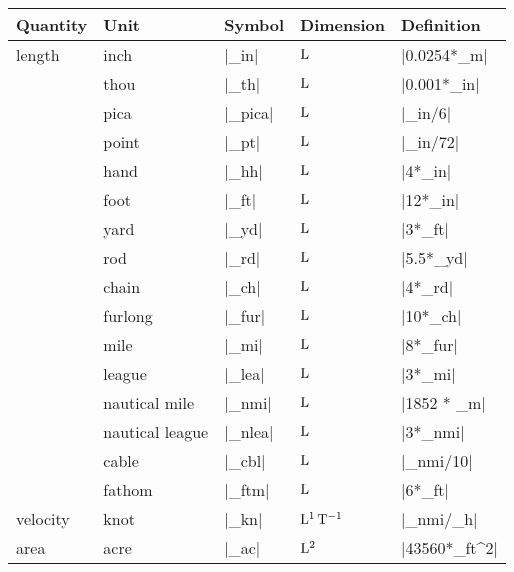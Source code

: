 \documentclass{ltxdoc}
\newcommand\thead[1]{#1}
\begin{document}
\begin{table}[H]
\centering
\begin{tabularx}{\linewidth}{%
  l%
  l%
  l%
  l%
  >{\setlength\hsize{1\hsize}}X%
}

\thead{Quantity} & \thead{Unit} & \thead{Symbol} & \thead{Dimension} & \thead{Definition} \\\hline

length & 
inch &
|_in| & 
$\L$ & 
|0.0254*_m| \\


 & 
thou &
|_th| & 
$\L$ & 
|0.001*_in| \\


 & 
pica &
|_pica| & 
$\L$ & 
|_in/6| \\


 & 
point &
|_pt| & 
$\L$ & 
|_in/72| \\


 & 
hand &
|_hh| & 
$\L$ & 
|4*_in| \\

 & 
foot &
|_ft| & 
$\L$ & 
|12*_in| \\

 & 
yard &
|_yd| & 
$\L$ & 
|3*_ft| \\

 & 
rod &
|_rd| & 
$\L$ & 
|5.5*_yd| \\


 & 
chain &
|_ch| & 
$\L$ & 
|4*_rd| \\


 & 
furlong &
|_fur| & 
$\L$ & 
|10*_ch| \\


 & 
mile &
|_mi| & 
$\L$ & 
|8*_fur| \\

 & 
league &
|_lea| & 
$\L$ & 
|3*_mi| \\

 & 
nautical mile &
|_nmi| & 
$\L$ & 
|1852 * _m| \\

 & 
nautical league &
|_nlea| & 
$\L$ & 
|3*_nmi| \\

 & 
cable &
|_cbl| & 
$\L$ & 
|_nmi/10| \\

 & 
fathom &
|_ftm| & 
$\L$ & 
|6*_ft| \\


velocity & 
knot &
|_kn| & 
$\L[1] \T[-1]$ & 
|_nmi/_h| \\


area & 
acre &
|_ac| & 
$\L[2]$ & 
|43560*_ft^2| \\



\end{tabularx}
\end{table}
\end{document}
